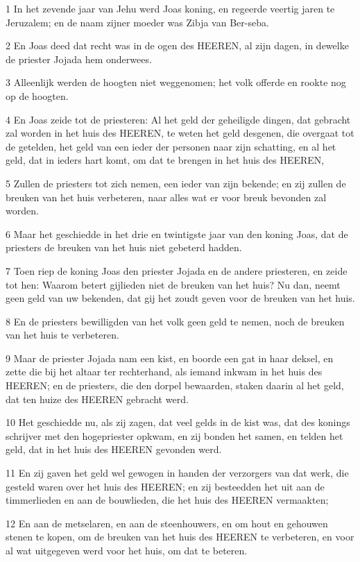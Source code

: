 \par 1 In het zevende jaar van Jehu werd Joas koning, en regeerde veertig jaren te Jeruzalem; en de naam zijner moeder was Zibja van Ber-seba.
\par 2 En Joas deed dat recht was in de ogen des HEEREN, al zijn dagen, in dewelke de priester Jojada hem onderwees.
\par 3 Alleenlijk werden de hoogten niet weggenomen; het volk offerde en rookte nog op de hoogten.
\par 4 En Joas zeide tot de priesteren: Al het geld der geheiligde dingen, dat gebracht zal worden in het huis des HEEREN, te weten het geld desgenen, die overgaat tot de getelden, het geld van een ieder der personen naar zijn schatting, en al het geld, dat in ieders hart komt, om dat te brengen in het huis des HEEREN,
\par 5 Zullen de priesters tot zich nemen, een ieder van zijn bekende; en zij zullen de breuken van het huis verbeteren, naar alles wat er voor breuk bevonden zal worden.
\par 6 Maar het geschiedde in het drie en twintigste jaar van den koning Joas, dat de priesters de breuken van het huis niet gebeterd hadden.
\par 7 Toen riep de koning Joas den priester Jojada en de andere priesteren, en zeide tot hen: Waarom betert gijlieden niet de breuken van het huis? Nu dan, neemt geen geld van uw bekenden, dat gij het zoudt geven voor de breuken van het huis.
\par 8 En de priesters bewilligden van het volk geen geld te nemen, noch de breuken van het huis te verbeteren.
\par 9 Maar de priester Jojada nam een kist, en boorde een gat in haar deksel, en zette die bij het altaar ter rechterhand, als iemand inkwam in het huis des HEEREN; en de priesters, die den dorpel bewaarden, staken daarin al het geld, dat ten huize des HEEREN gebracht werd.
\par 10 Het geschiedde nu, als zij zagen, dat veel gelds in de kist was, dat des konings schrijver met den hogepriester opkwam, en zij bonden het samen, en telden het geld, dat in het huis des HEEREN gevonden werd.
\par 11 En zij gaven het geld wel gewogen in handen der verzorgers van dat werk, die gesteld waren over het huis des HEEREN; en zij besteedden het uit aan de timmerlieden en aan de bouwlieden, die het huis des HEEREN vermaakten;
\par 12 En aan de metselaren, en aan de steenhouwers, en om hout en gehouwen stenen te kopen, om de breuken van het huis des HEEREN te verbeteren, en voor al wat uitgegeven werd voor het huis, om dat te beteren.
